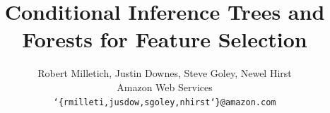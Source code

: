 \documentclass[11pt]{article}
\title{Conditional Inference Trees and Forests for Feature Selection}
\author{%
  Robert Milletich, Justin Downes, Steve Goley, Newel Hirst\\
  Amazon Web Services\\
  \texttt{\char`\{rmilleti,jusdow,sgoley,nhirst\char`\}@amazon.com}
}
\date{}
\begin{document}
\maketitle

\begin{abstract}

\end{abstract}















\clearpage
\begin{appendices}
\let\FloatBarrier\relax








\end{appendices}
\end{document}

